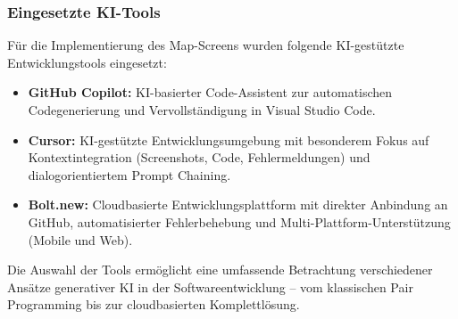 \subsubsection{Eingesetzte KI-Tools}

Für die Implementierung des Map-Screens wurden folgende KI-gestützte
Entwicklungstools eingesetzt:

\begin{itemize}
      \item \textbf{GitHub Copilot:} KI-basierter Code-Assistent zur automatischen Codegenerierung und Vervollständigung in Visual Studio Code.
      \item \textbf{Cursor:} KI-gestützte Entwicklungsumgebung mit besonderem Fokus auf Kontextintegration (Screenshots, Code, Fehlermeldungen) und dialogorientiertem Prompt Chaining.
      \item \textbf{Bolt.new:} Cloudbasierte Entwicklungsplattform mit direkter Anbindung an GitHub, automatisierter Fehlerbehebung und Multi-Plattform-Unterstützung (Mobile und Web).
\end{itemize}

Die Auswahl der Tools ermöglicht eine umfassende Betrachtung verschiedener
Ansätze generativer KI in der Softwareentwicklung – vom klassischen Pair
Programming bis zur cloudbasierten Komplettlösung.

